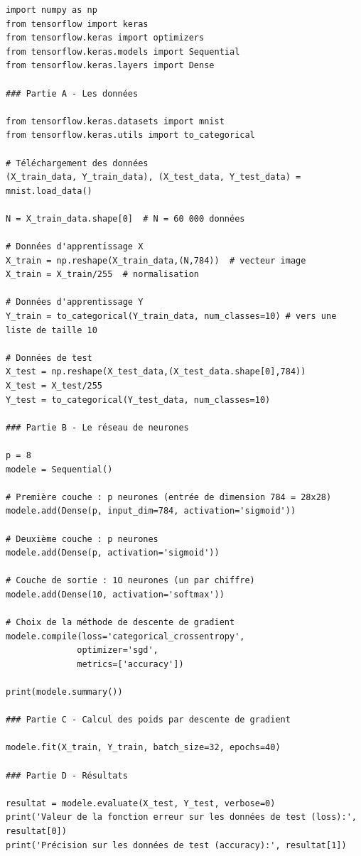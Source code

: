 \documentclass[11pt,class=report,crop=false]{standalone}
\begin{document}
\begin{lstlisting}
import numpy as np
from tensorflow import keras
from tensorflow.keras import optimizers
from tensorflow.keras.models import Sequential
from tensorflow.keras.layers import Dense

### Partie A - Les données

from tensorflow.keras.datasets import mnist
from tensorflow.keras.utils import to_categorical

# Téléchargement des données
(X_train_data, Y_train_data), (X_test_data, Y_test_data) = mnist.load_data()

N = X_train_data.shape[0]  # N = 60 000 données

# Données d'apprentissage X
X_train = np.reshape(X_train_data,(N,784))  # vecteur image
X_train = X_train/255  # normalisation

# Données d'apprentissage Y
Y_train = to_categorical(Y_train_data, num_classes=10) # vers une liste de taille 10

# Données de test
X_test = np.reshape(X_test_data,(X_test_data.shape[0],784))
X_test = X_test/255
Y_test = to_categorical(Y_test_data, num_classes=10)

### Partie B - Le réseau de neurones

p = 8
modele = Sequential()

# Première couche : p neurones (entrée de dimension 784 = 28x28)
modele.add(Dense(p, input_dim=784, activation='sigmoid'))

# Deuxième couche : p neurones
modele.add(Dense(p, activation='sigmoid'))

# Couche de sortie : 1O neurones (un par chiffre)
modele.add(Dense(10, activation='softmax'))

# Choix de la méthode de descente de gradient
modele.compile(loss='categorical_crossentropy', 
              optimizer='sgd',  
              metrics=['accuracy'])

print(modele.summary())

### Partie C - Calcul des poids par descente de gradient

modele.fit(X_train, Y_train, batch_size=32, epochs=40)

### Partie D - Résultats

resultat = modele.evaluate(X_test, Y_test, verbose=0)
print('Valeur de la fonction erreur sur les données de test (loss):', resultat[0])
print('Précision sur les données de test (accuracy):', resultat[1])
\end{lstlisting} 
\end{document}
